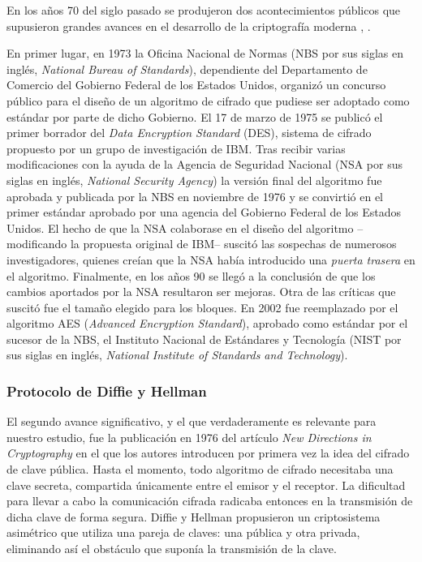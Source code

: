 \documentclass[
  a4paper,
  12pt,
  spanish,
]{scrartcl}
\begin{document}
En los años 70 del siglo pasado se produjeron dos acontecimientos públicos que supusieron grandes avances en el desarrollo de la criptografía moderna \parencite{singh_code_2003}, \parencite{thawte_history_2013}.

En primer lugar, en 1973 la Oficina Nacional de Normas (NBS por sus siglas en inglés, \textit{National Bureau of Standards}), dependiente del Departamento de Comercio del Gobierno Federal de los Estados Unidos, organizó un concurso público para el diseño de un algoritmo de cifrado que pudiese ser adoptado como estándar por parte de dicho Gobierno. 
El 17 de marzo de 1975 se publicó el primer borrador del \textit{Data Encryption Standard} (DES), sistema de cifrado propuesto por un grupo de investigación de IBM.
Tras recibir varias modificaciones con la ayuda de la Agencia de Seguridad Nacional (NSA por sus siglas en inglés, \textit{National Security Agency}) la versión final del algoritmo fue aprobada y publicada por la NBS en noviembre de 1976 y se convirtió en el primer estándar aprobado por una agencia del Gobierno Federal de los Estados Unidos. 
El hecho de que la NSA colaborase en el diseño del algoritmo --modificando la propuesta original de IBM-- suscitó las sospechas de numerosos investigadores, quienes creían que la NSA había introducido una \textit{puerta trasera} en el algoritmo. 
Finalmente, en los años 90 se llegó a la conclusión de que los cambios aportados por la NSA resultaron ser mejoras. %
Otra de las críticas que suscitó fue el tamaño elegido para los bloques.
En 2002 fue reemplazado por el algoritmo AES (\textit{Advanced Encryption Standard}), aprobado como estándar por el sucesor de la NBS, el Instituto Nacional de Estándares y Tecnología (NIST por sus siglas en inglés, \textit{National Institute of Standards and Technology}).

\subsubsection{Protocolo de Diffie y Hellman}

El segundo avance significativo, y el que verdaderamente es relevante para nuestro estudio, fue la publicación en 1976 del artículo \textit{New Directions in Cryptography} \parencite{diffie_new_1976} en el que los autores introducen por primera vez la idea del cifrado de clave pública. 
Hasta el momento, todo algoritmo de cifrado necesitaba una clave secreta, compartida únicamente entre el emisor y el receptor. 
La dificultad para llevar a cabo la comunicación cifrada radicaba entonces en la transmisión de dicha clave de forma segura. 
Diffie y Hellman propusieron un criptosistema asimétrico que utiliza una pareja de claves: una pública y otra privada, eliminando así el obstáculo que suponía la transmisión de la clave.
\end{document}
